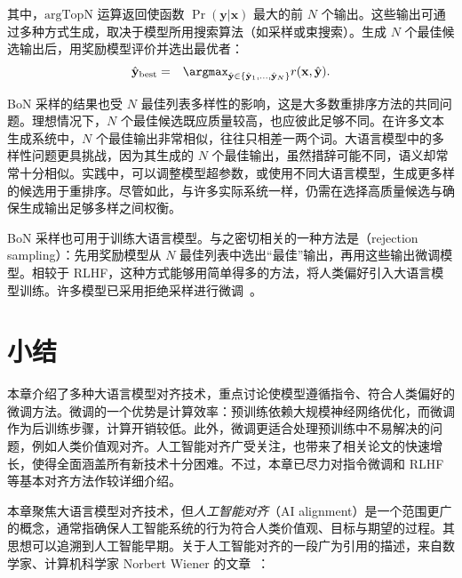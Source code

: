 \noindent 其中，$\mathrm{argTopN}$ 运算返回使函数 $\Pr(\mathbf{y}|\mathbf{x})$ 最大的前 $N$ 个输出。这些输出可通过多种方式生成，取决于模型所用搜索算法（如采样或束搜索）。生成 $N$ 个最佳候选输出后，用奖励模型评价并选出最优者：
\begin{eqnarray}
\hat{\mathbf{y}}_{\mathrm{best}} & = & \argmax_{\hat{\mathbf{y}} \in \{\hat{\mathbf{y}}_1,\ldots,\hat{\mathbf{y}}_N\}} r(\mathbf{x},\hat{\mathbf{y}}).
\end{eqnarray}

BoN 采样的结果也受 $N$ 最佳列表多样性的影响，这是大多数重排序方法的共同问题。理想情况下，$N$ 个最佳候选既应质量较高，也应彼此足够不同。在许多文本生成系统中，$N$ 个最佳输出非常相似，往往只相差一两个词。大语言模型中的多样性问题更具挑战，因为其生成的 $N$ 个最佳输出，虽然措辞可能不同，语义却常常十分相似。实践中，可以调整模型超参数，或使用不同大语言模型，生成更多样的候选用于重排序。尽管如此，与许多实际系统一样，仍需在选择高质量候选与确保生成输出足够多样之间权衡。

BoN 采样也可用于训练大语言模型。与之密切相关的一种方法是（rejection sampling）：先用奖励模型从 $N$ 最佳列表中选出“最佳”输出，再用这些输出微调模型。相较于 RLHF，这种方式能够用简单得多的方法，将人类偏好引入大语言模型训练。许多模型已采用拒绝采样进行微调~\cite{nakano-etal:2021webgpt,touvron-etal:2023llama2}。


\section{小结}

本章介绍了多种大语言模型对齐技术，重点讨论使模型遵循指令、符合人类偏好的微调方法。微调的一个优势是计算效率：预训练依赖大规模神经网络优化，而微调作为后训练步骤，计算开销较低。此外，微调更适合处理预训练中不易解决的问题，例如人类价值观对齐。人工智能对齐广受关注，也带来了相关论文的快速增长，使得全面涵盖所有新技术十分困难。不过，本章已尽力对指令微调和 RLHF 等基本对齐方法作较详细介绍。

本章聚焦大语言模型对齐技术，但\textit{人工智能对齐}（AI alignment）是一个范围更广的概念，通常指确保人工智能系统的行为符合人类价值观、目标与期望的过程。其思想可以追溯到人工智能早期。关于人工智能对齐的一段广为引用的描述，来自数学家、计算机科学家 Norbert Wiener 的文章~\cite{wiener:1960some}：

